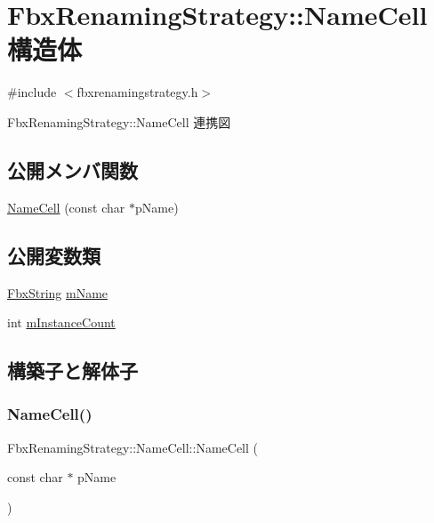 \hypertarget{struct_fbx_renaming_strategy_1_1_name_cell}{}\section{Fbx\+Renaming\+Strategy\+:\+:Name\+Cell 構造体}
\label{struct_fbx_renaming_strategy_1_1_name_cell}


{\ttfamily \#include $<$fbxrenamingstrategy.\+h$>$}



Fbx\+Renaming\+Strategy\+:\+:Name\+Cell 連携図
\subsection*{公開メンバ関数}
\begin{DoxyCompactItemize}
\item 
\hyperlink{struct_fbx_renaming_strategy_1_1_name_cell_a22965f5005aae1a3ea2dcd177ae51bab}{Name\+Cell} (const char $\ast$p\+Name)
\end{DoxyCompactItemize}
\subsection*{公開変数類}
\begin{DoxyCompactItemize}
\item 
\hyperlink{class_fbx_string}{Fbx\+String} \hyperlink{struct_fbx_renaming_strategy_1_1_name_cell_a42d722092fdfc81312ef6f0199794580}{m\+Name}
\item 
int \hyperlink{struct_fbx_renaming_strategy_1_1_name_cell_a2088a0ee75680e2e817f9b782c258e78}{m\+Instance\+Count}
\end{DoxyCompactItemize}


\subsection{構築子と解体子}
\mbox{\label{struct_fbx_renaming_strategy_1_1_name_cell_a22965f5005aae1a3ea2dcd177ae51bab}} 
\subsubsection{\texorpdfstring{Name\+Cell()}{NameCell()}}
{\footnotesize\ttfamily Fbx\+Renaming\+Strategy\+::\+Name\+Cell\+::\+Name\+Cell (\begin{DoxyParamCaption}\item[{const char $\ast$}]{p\+Name }\end{DoxyParamCaption})}



